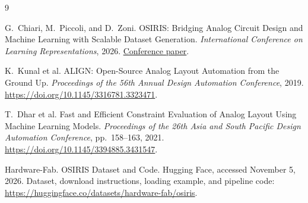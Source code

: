 \documentclass[11pt,letterpaper]{article}
\begin{document}
\newpage

\begin{thebibliography}{9}

G.~Chiari, M.~Piccoli, and D.~Zoni.
OSIRIS: Bridging Analog Circuit Design and Machine Learning with Scalable
Dataset Generation.
\textit{International Conference on Learning Representations}, 2026.
\href{https://proceedings.iclr.cc/paper_files/paper/2026/hash/9c0be694049f5b6fb35ed9ef12da34b0-Abstract-Conference.html}{Conference paper}.

K.~Kunal et al.
ALIGN: Open-Source Analog Layout Automation from the Ground Up.
\textit{Proceedings of the 56th Annual Design Automation Conference}, 2019.
\url{https://doi.org/10.1145/3316781.3323471}.

T.~Dhar et al.
Fast and Efficient Constraint Evaluation of Analog Layout Using Machine
Learning Models.
\textit{Proceedings of the 26th Asia and South Pacific Design Automation
Conference}, pp.~158--163, 2021.
\url{https://doi.org/10.1145/3394885.3431547}.

Hardware-Fab.
OSIRIS Dataset and Code.
Hugging Face, accessed November 5, 2026.
Dataset, download instructions, loading example, and pipeline code:
\url{https://huggingface.co/datasets/hardware-fab/osiris}.

\end{thebibliography}
\end{document}
